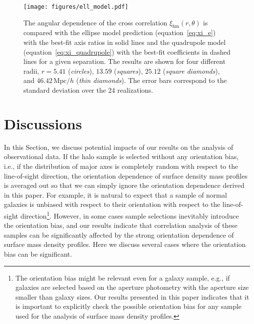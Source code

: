 \documentclass[a4paper,fleqn,usenatbib]{mnras}
\newcommand{\Mpc}{\mathrm{Mpc}}
\newcommand{\rmhm}{\mathrm{hm}}
\begin{document}
\begin{figure}
\texttt{[image: figures/ell\_model.pdf]}
\caption{The angular dependence of the cross correlation
$\xi_\rmhm (r, \theta)$ is compared with
the ellipse model prediction (equation~\ref{eq:xi_e})
with the best-fit axis ratios in solid lines and the quadrupole model
(equation~\ref{eq:xi_quadrupole}) with the best-fit coefficients
in dashed lines for a given separation.
The results are shown for four different radii,
$r=5.41$ ({\it circles}), $13.59$ ({\it squares}), $25.12$ ({\it square diamonds}),
and $46.42\,\Mpc/h$ ({\it thin diamonds}).
The error bars correspond to the standard deviation over the 24 realizations.}
\label{fig:ell_model}
\end{figure}

\section{Discussions}
\label{sec:discussions}
In this Section, we discuss potential impacts of our results on the
analysis of observational data. If the halo sample is selected without
any orientation bias, i.e., if the distribution of major axes is
completely random with respect to the line-of-sight direction, the
orientation dependence of surface density mass profiles is averaged out
so that we can simply ignore the orientation dependence derived in
this paper. For example, it is natural to expect that a sample of
normal galaxies is unbiased with respect to their orientation with
respect to the line-of-sight direction\footnote{The orientation bias
might be relevant even for a galaxy sample, e.g., if galaxies are
selected based on the aperture photometry with the aperture size
smaller than galaxy sizes. Our results presented in this paper
indicates that it is important to explicitly check the possible
orientation bias for any sample used for the analysis of surface
mass density profiles.}.
However, in some cases sample selections
inevitably introduce the orientation bias, and our results indicate
that correlation analysis of these samples can be significantly
affected by the strong orientation dependence of surface mass density
profiles. Here we discuss several cases where the orientation bias
can be significant.
\end{document}
